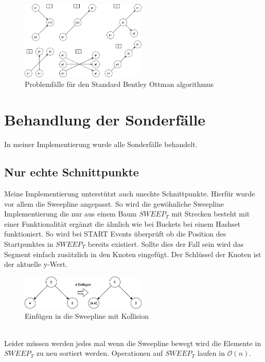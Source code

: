 \documentclass[conference]{IEEEtran}
\begin{document}
	\begin{figure}[h]
		\begin{center}
			\includegraphics[width=6cm]{ProblemFaelle.png}
			\caption{Problemfälle für den Standard Bentley Ottman algorithmus}
			\label{figure_3}
		\end{center}
	\end{figure}



	\section{Behandlung der Sonderfälle}
	In meiner Implementierung wurde alle Sonderfälle behandelt.
	\subsection{Nur echte Schnittpunkte}
	Meine Implementierung unterstützt auch unechte Schnittpunkte. Hierfür wurde vor allem die Sweepline angepasst. So wird die gewöhnliche Sweepline Implementierung die nur aus einem Baum $SWEEP_{T}$ mit Strecken besteht mit einer Funktionalität ergänzt die ähnlich wie bei Buckets bei einem Hashset funktioniert. So wird bei START Events überprüft ob die Position des Startpunktes in $SWEEP_{T}$ bereits existiert. Sollte dies der Fall sein wird das Segment einfach zusätzlich in den Knoten eingefügt. Der Schlüssel der Knoten ist der aktuelle y-Wert.\\
	\begin{figure}[h!]
		\begin{center}
			\includegraphics[width=6cm]{BaumKollision.png}
			\caption{Einfügen in die Sweepline mit Kollision}
			\label{figure_collision}
		\end{center}
	\end{figure}\\
	Leider müssen werden jedes mal wenn die Sweepline bewegt wird die Elemente in $SWEEP_{T}$ zu neu sortiert werden. Operationen auf $SWEEP_{T}$ laufen in $\mathcal{O}(n)$. 
	
\end{document}
